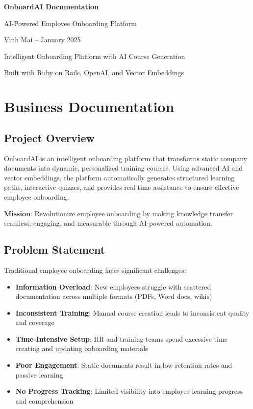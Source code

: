 \documentclass[a4paper,11pt]{article}
\begin{document}
\begin{titlepage}
    \centering
    \vspace*{2cm}
    {\Huge\bfseries OnboardAI Documentation\par}
    \vspace{1cm}
    {\Large AI-Powered Employee Onboarding Platform\par}
    \vspace{0.5cm}
    {\large Vinh Mai -- January 2025\par}
    \vspace{2cm}
    {\normalsize Intelligent Onboarding Platform with AI Course Generation\par}
    \vspace{1cm}
    {\footnotesize Built with Ruby on Rails, OpenAI, and Vector Embeddings\par}
\end{titlepage}

\tableofcontents
\newpage

\section{Business Documentation}
\color{headerblue}
\subsection{Project Overview}
\color{black}

OnboardAI is an intelligent onboarding platform that transforms static company documents into dynamic, personalized training courses. Using advanced AI and vector embeddings, the platform automatically generates structured learning paths, interactive quizzes, and provides real-time assistance to ensure effective employee onboarding.

\textbf{Mission}: Revolutionize employee onboarding by making knowledge transfer seamless, engaging, and measurable through AI-powered automation.

\subsection{Problem Statement}

Traditional employee onboarding faces significant challenges:
\begin{itemize}
    \item \textbf{Information Overload}: New employees struggle with scattered documentation across multiple formats (PDFs, Word docs, wikis)
    \item \textbf{Inconsistent Training}: Manual course creation leads to inconsistent quality and coverage
    \item \textbf{Time-Intensive Setup}: HR and training teams spend excessive time creating and updating onboarding materials
    \item \textbf{Poor Engagement}: Static documents result in low retention rates and passive learning
    \item \textbf{No Progress Tracking}: Limited visibility into employee learning progress and comprehension
\end{itemize}
\end{document}
